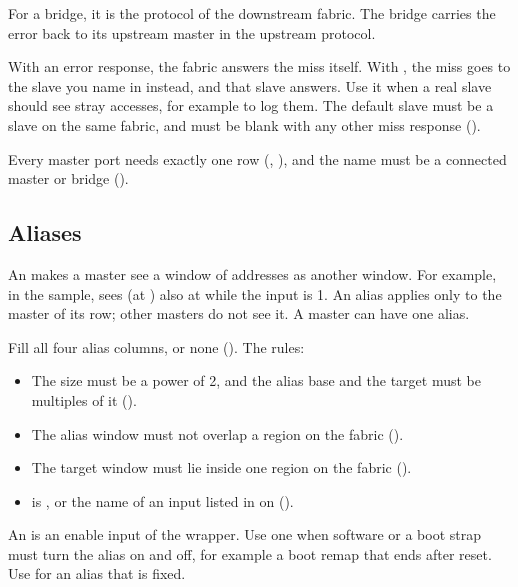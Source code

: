 For a bridge, it is the protocol of the downstream fabric. The bridge carries the error
back to its upstream master in the upstream protocol.

With an error response, the fabric answers the miss itself. With ,
the miss goes to the slave you name in  instead, and that slave
answers. Use it when a real slave should see stray accesses, for example to log them.
The default slave must be a slave on the same fabric, and  must be
blank with any other miss response ().

Every master port needs exactly one row (,
), and the name must be a connected master or bridge
().

\subsection{Aliases}

An  makes a master see a window of addresses as another window. For example,
in the sample,  sees  (at ) also at
 while the input  is 1. An alias applies only to
the master of its row; other masters do not see it. A master can have one alias.

Fill all four alias columns, or none (). The rules:

\begin{itemize}
\item The size must be a power of 2, and the alias base and the target must be
  multiples of it ().
\item The alias window must not overlap a region on the fabric
  ().
\item The target window must lie inside one region on the fabric
  ().
\item {} is , or the name of an input listed in
   on  ().
\end{itemize}

An  is an enable input of the wrapper. Use one when software or a boot
strap must turn the alias on and off, for example a boot remap that ends after reset.
Use  for an alias that is fixed.

